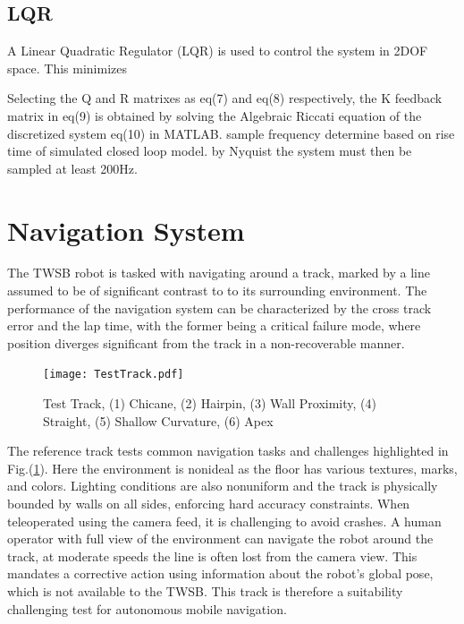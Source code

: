         \subsection{LQR}
        A Linear Quadratic Regulator (LQR) is used to control the system in 2DOF space.
        This minimizes 
        
       
        Selecting the Q and R matrixes as eq(7) and eq(8) respectively, 
        the K feedback matrix in eq(9) is obtained by solving the Algebraic Riccati
        equation of the discretized system eq(10) in MATLAB.
        sample frequency determine based on rise time of simulated closed loop model. 
        by Nyquist the system must then be sampled at least 200Hz. 

        \pagebreak{}
        \section{Navigation System}
        The TWSB robot is tasked with navigating around a track, marked by a line assumed to be of significant contrast to to its 
        surrounding environment. The performance of the navigation system can be characterized by the cross track error and the lap time, 
        with the former being a critical failure mode, where position diverges significant from the track in a non-recoverable manner.
        \begin{figure}[H]
            \centering
            \texttt{[image: TestTrack.pdf]}
            \caption{Test Track, (1) Chicane, (2) Hairpin, (3) Wall Proximity, (4) Straight, (5) Shallow Curvature, (6) Apex}
            \label{fig:TestTrack}
        \end{figure}
        The reference track tests common navigation tasks and challenges highlighted in Fig.(\ref{fig:TestTrack}). 
        Here the environment is nonideal as the floor has various textures, marks, and colors.
        Lighting conditions are also nonuniform and the track is physically bounded by walls on all sides, enforcing hard accuracy constraints. 
        When teleoperated using the camera feed, it is challenging to avoid crashes. A human operator with 
        full view of the environment can navigate the robot around the track, at moderate speeds the line is often lost 
        from the camera view. This mandates a corrective action using information about the robot's global pose, 
        which is not available to the TWSB. This track is therefore a suitability challenging test for autonomous mobile navigation.
            
